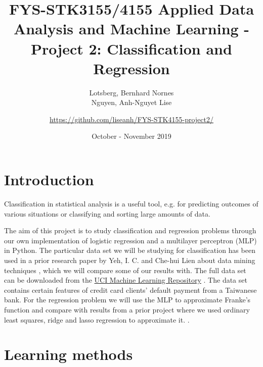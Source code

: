 \documentclass[a4paper, 11pt, twocolumn]{article}
\title{FYS-STK3155/4155 Applied Data Analysis and Machine Learning - Project 2: Classification and Regression }
\author{Lotsberg, Bernhard Nornes \\ Nguyen, Anh-Nguyet Lise \and \url{https://github.com/liseanh/FYS-STK4155-project2/}}
\date{October - November 2019}
\begin{document}

\section{Introduction}
Classification in statistical analysis is a useful tool, e.g. for predicting
outcomes of various situations or classifying and sorting large amounts of data.

The aim of this project is  to study classification and regression problems
through our own implementation of logistic regression and a multilayer perceptron
(MLP) in Python. The particular data set we will be studying for classification
has been used in a prior research paper by Yeh, I. C. and Che-hui Lien about
data mining techniques \cite{origarticle}, which we will compare some of our
results with.  The full data set can be downloaded from the \href{https://archive.ics.uci.edu/ml/datasets/default+of+credit+card+clients}{UCI Machine
Learning Repository} \cite{UCI}. The data set contains certain features of
credit card clients' default payment from a Taiwanese bank.
For the regression problem we will use the MLP to approximate Franke's function
and compare with results from a prior project where we used ordinary least
squares, ridge and lasso regression to approximate it. \cite{regpaper}.


\section{Learning methods}
\end{document}
